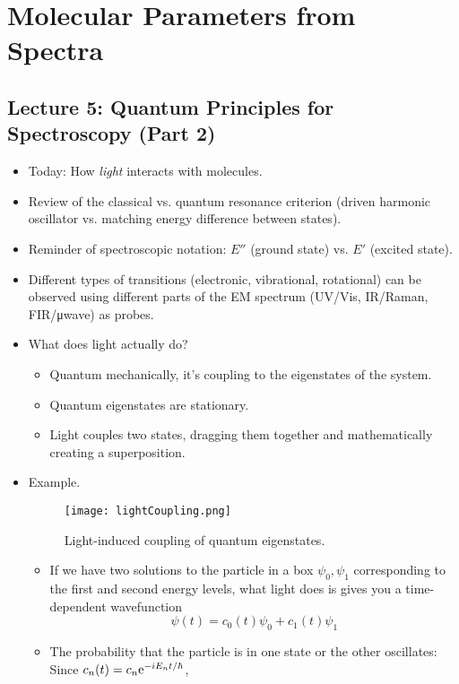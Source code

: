 \documentclass[../notes.tex]{subfiles}
\begin{document}
\chapter{Molecular Parameters from Spectra}
\section{Lecture 5: Quantum Principles for Spectroscopy (Part 2)}
\begin{itemize}
    \item {}Today: How \emph{light} interacts with molecules.
    \item Review of the classical vs. quantum resonance criterion (driven harmonic oscillator vs. matching energy difference between states).
    \item Reminder of spectroscopic notation: $E''$ (ground state) vs. $E'$ (excited state).
    \item Different types of transitions (electronic, vibrational, rotational) can be observed using different parts of the EM spectrum (UV/Vis, IR/Raman, FIR/\si{\micro wave}) as probes.
    \item What does light actually do?
    \begin{itemize}
        \item Quantum mechanically, it's coupling to the eigenstates of the system.
        \item Quantum eigenstates are stationary.
        \item Light couples two states, dragging them together and mathematically creating a superposition.
    \end{itemize}
    \item Example.
    \begin{figure}[h!]
        \centering
        \texttt{[image: lightCoupling.png]}
        \caption{Light-induced coupling of quantum eigenstates.}
        \label{fig:lightCoupling}
    \end{figure}
    \begin{itemize}
        \item If we have two solutions to the particle in a box $\psi_0,\psi_1$ corresponding to the first and second energy levels, what light does is gives you a time-dependent wavefunction
        \begin{equation*}
            \psi(t) = c_0(t)\psi_0+c_1(t)\psi_1
        \end{equation*}
        \item The probability that the particle is in one state or the other oscillates: Since $c_n(t)=c_n\e[-iE_nt/\hbar]$,

\end{itemize}
\end{itemize}
\end{document}

